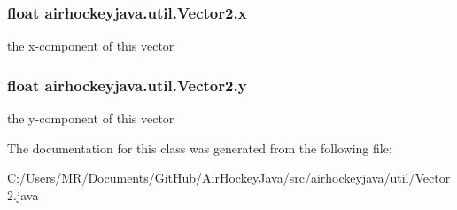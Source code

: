\subsubsection[{x}]{\setlength{\rightskip}{0pt plus 5cm}float airhockeyjava.\+util.\+Vector2.\+x}\label{classairhockeyjava_1_1util_1_1_vector2_a5cb47d6c109d38c9cd59608e9c94c2e3}
the x-\/component of this vector \hypertarget{classairhockeyjava_1_1util_1_1_vector2_a298d8ff99b5daf0854ecf879b3031ecd}{}
\subsubsection[{y}]{\setlength{\rightskip}{0pt plus 5cm}float airhockeyjava.\+util.\+Vector2.\+y}\label{classairhockeyjava_1_1util_1_1_vector2_a298d8ff99b5daf0854ecf879b3031ecd}
the y-\/component of this vector 

The documentation for this class was generated from the following file\+:\begin{DoxyCompactItemize}
\item 
C\+:/\+Users/\+M\+R/\+Documents/\+Git\+Hub/\+Air\+Hockey\+Java/src/airhockeyjava/util/Vector2.\+java\end{DoxyCompactItemize}
